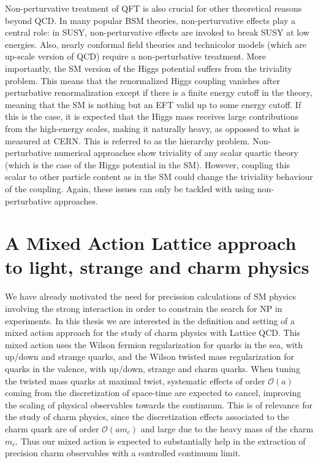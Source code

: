 Non-perturvative treatment of QFT is also crucial for other theoretical reasons beyond QCD. In many popular BSM theories, non-perturvative effects play a central role: in SUSY, non-perturvative effects are invoked to break SUSY at low energies. Also, nearly conformal field theories and technicolor models (which are up-scale version of QCD) require a non-perturbative treatment. More importantly, the SM version of the Higgs potential suffers from the triviality problem. This means that the renormalized Higgs coupling vanishes after perturbative renormalization except if there is a finite energy cutoff in the theory, meaning that the SM is nothing but an EFT valid up to some energy cutoff. If this is the case, it is expected that the Higgs mass receives large contributions from the high-energy scales, making it naturally heavy, as oppossed to what is measured at CERN. This is referred to as the hierarchy problem. Non-perturbative numerical approaches show triviality of any scalar quartic theory (which is the case of the Higgs potential in the SM). However, coupling this scalar to other particle content as in the SM could change the triviality behaviour of the coupling. Again, these issues can only be tackled with using non-perturbative approaches.

\section{A Mixed Action Lattice approach to light, strange and charm physics}

We have already motivated the need for precission calculations of SM physics involving the strong interaction in order to constrain the search for NP in experiments. In this thesis we are interested in the definition and setting of a mixed action approach for the study of charm physics with Lattice QCD. This mixed action uses the Wilson fermion regularization for quarks in the sea, with up/down and strange quarks, and the Wilson twisted mass regularization for quarks in the valence, with up/down, strange and charm quarks. When tuning the twisted mass quarks at maximal twist, systematic effects of order $\mathcal{O}(a)$ coming from the discretization of space-time are expected to cancel, improving the scaling of physical observables towards the continuum. This is of relevance for the study of charm physics, since the discretization effects associated to the charm quark are of order $\mathcal{O}(am_c)$ and large due to the heavy mass of the charm $m_c$. Thus our mixed action is expected to substantially help in the extraction of precision charm observables with a controlled continuum limit.

